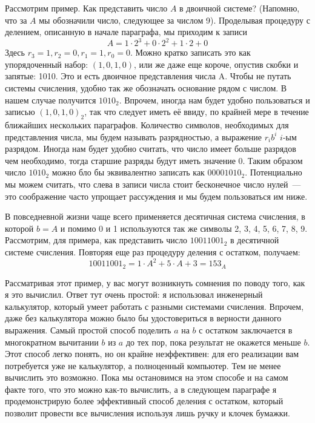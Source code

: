 Рассмотрим пример. Как представить число $A$ в двоичной системе? (Напомню, что за $A$ мы обозначили число, следующее за числом 9). Проделывая процедуру с делением, описанную в начале параграфа, мы приходим к записи
$$A = 1\cdot 2^3 + 0\cdot 2^2 + 1\cdot 2 + 0$$
Здесь $r_3 = 1, r_2 = 0, r_1 = 1, r_0 = 0$. Можно кратко записать это как упорядоченный набор: $(1, 0, 1, 0)$, или же даже еще короче, опустив скобки и запятые: 1010. Это и есть двоичное представления числа A. Чтобы не путать системы счисления, удобно так же обозначать основание рядом с числом. В нашем случае получится $1010_2$. Впрочем, иногда нам будет удобно пользоваться и записью $(1, 0, 1, 0)_2$, так что следует иметь её ввиду, по крайней мере в течение ближайших нескольких параграфов. Количество символов, необходимых для представления числа, мы будем называть разрядностью, а выражение $r_ib^i$ $i$-ым разрядом. Иногда нам будет удобно считать, что число имеет больше разрядов чем необходимо, тогда старшие разряды будут иметь значение 0. Таким образом число $1010_2$ можно бло бы эквивалентно записать как $00001010_2$. Потенциально мы можем считать, что слева в записи числа стоит бесконечное число нулей~--- это соображение часто упрощает рассуждения и мы будем пользоваться им ниже.

В повседневной жизни чаще всего применяется десятичная система счисления, в которой $b=A$ и помимо 0 и 1 используются так же символы 2, 3, 4, 5, 6, 7, 8, 9. Рассмотрим, для примера, как представить число $10011001_2$ в десятичной системе счисления. Повторяя еще раз процедуру деления с остатком, получаем:
$$10011001_2 = 1\cdot A^2 + 5\cdot A + 3 = 153_A$$

Рассматривая этот пример, у вас могут возникнуть сомнения по поводу того, как я это вычислил. Ответ тут очень простой: я использовал инженерный калькулятор, который умеет работать с разными системами счисления. Впрочем, даже без калькулятора можно было бы удостовериться в верности данного выражения. Самый простой способ поделить $a$ на $b$ с остатком заключается в многократном вычитании $b$ из $a$ до тех пор, пока результат не окажется меньше $b$. Этот способ легко понять, но он крайне неэффективен: для его реализации вам потребуется уже не калькулятор, а полноценный компьютер. Тем не менее вычислить это возможно. Пока мы остановимся на этом способе и на самом факте того, что это можно как-то вычислить, а в следующем параграфе я продемонстрирую более эффективный способ деления с остатком, который позволит провести все вычисления используя лишь ручку и клочек бумажки.

